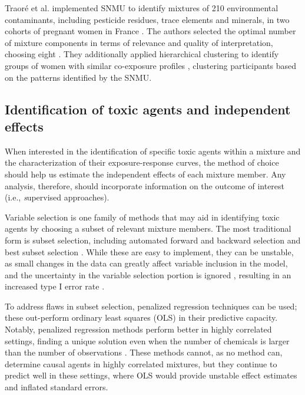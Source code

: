 Traor\'{e} et al. implemented SNMU to identify mixtures of 210 environmental contaminants, including pesticide residues, trace elements and minerals, in two cohorts of pregnant women in France \citep{traore2018}. The authors selected the optimal number of mixture components in terms of relevance and quality of interpretation, choosing eight \citep{traore2018}. They additionally applied hierarchical clustering to identify groups of women with similar co-exposure profiles \citep{traore2018}, clustering participants based on the patterns identified by the SNMU.

\subsection{Identification of toxic agents and independent effects}\label{sec:Ind}

When interested in the identification of specific toxic agents within a mixture and the characterization of their exposure-response curves, the method of choice should help us estimate the independent effects of each mixture member. Any analysis, therefore, should incorporate information on the outcome of interest (i.e., {\textit supervised} approaches).

Variable selection is one family of methods that may aid in identifying toxic agents by choosing a subset of relevant mixture members. The most traditional form is subset selection, including automated forward and backward selection and best subset selection \citep{ISLR}. While these are easy to implement, they can be unstable, as small changes in the data can greatly affect variable inclusion in the model, and the uncertainty in the variable selection portion is ignored \citep{shen2002adaptive, fan2001variable}, resulting in an increased type I error rate \citep{leamer1978specification, raftery1996approximate, draper1995assessment}.

To address flaws in subset selection, penalized regression techniques can be used; these out-perform ordinary least squares (OLS) in their predictive capacity. Notably, penalized regression methods perform better in highly correlated settings, finding a unique solution even when the number of chemicals is larger than the number of observations \citep{fan2006statistical}. These methods cannot, as no method can, determine causal agents in highly correlated mixtures, but they continue to predict well in these settings, where OLS would provide unstable effect estimates and inflated standard errors. 

